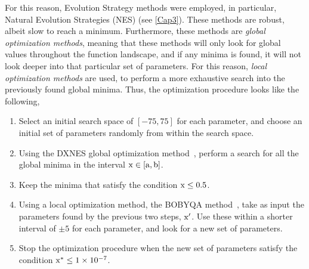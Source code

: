 For this reason, Evolution Strategy methods were employed, in particular, Natural Evolution 
Strategies (NES) (see \autoref{Cap3}). These methods are robust, albeit slow to reach a 
minimum. 
Furthermore, these methods are \emph{global optimization methods}, meaning that these 
methods will only look for global values throughout the function landscape, and if any 
minima is found, it will not look deeper into that particular set of parameters. For this 
reason, \emph{local optimization methods} are used, to perform a more exhaustive search 
into the previously found global minima. Thus, the optimization procedure looks like the 
following,
\begin{enumerate}
    \item Select an initial search space of \(\left[-75, 75\right]\) for each parameter, and choose an initial set of parameters randomly from within the search space.
    \item Using the DXNES global optimization method~\cite{nomuraDistanceweightedExponentialNatural2021}, perform a search for all the global minima in the interval \(\rm{x} \in \left[a, b\right]\).
    \item Keep the minima that satisfy the condition \(\rm{x} \leq 0.5\).
    \item Using a local optimization method, the BOBYQA method~\cite{powellUOBYQAUnconstrainedOptimization2002}, take as input the parameters found by the previous two steps, \(\rm{x}^{\prime}\). Use these within a shorter interval of \(\pm 5\) for each parameter, and look for a new set of parameters.
    \item Stop the optimization procedure when the new set of parameters satisfy the condition \(\rm{x}^{*} \leq \num{1e-7}\).
\end{enumerate}

